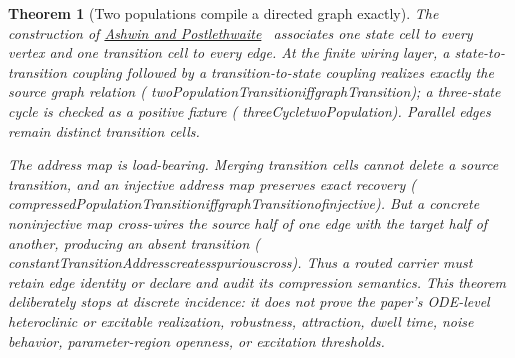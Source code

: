 \documentclass[11pt]{article}
\newtheorem{theorem}{Theorem}[section]
\newcommand{\leanname}[1]{{\scriptsize\ttfamily
  \def\_{\textunderscore\allowbreak}#1}}
\begin{document}
\begin{theorem}[Two populations compile a directed graph exactly]
The construction of
\href{https://arxiv.org/abs/1506.03212}{Ashwin and
Postlethwaite}~\cite{ashwinpostlethwaite2015} associates one state cell to
every vertex and one transition cell to every edge. At the finite wiring
layer, a state-to-transition coupling followed by a transition-to-state
coupling realizes exactly the source graph relation
(\leanname{twoPopulationTransition\_iff\_graphTransition}); a three-state
cycle is checked as a positive fixture
(\leanname{threeCycle\_twoPopulation}). Parallel edges remain
distinct transition cells.

The address map is load-bearing. Merging transition cells cannot delete a
source transition, and an injective address map preserves exact recovery
(\leanname{compressedPopulationTransition\_iff\_graphTransition\_of\_injective}).
But a concrete noninjective map cross-wires the source half of one edge with
the target half of another, producing an absent transition
(\leanname{constantTransitionAddress\_creates\_spurious\_cross}). Thus a
routed carrier must retain edge identity or declare and audit its compression
semantics. This theorem deliberately stops at discrete incidence: it does not
prove the paper's ODE-level heteroclinic or excitable realization, robustness,
attraction, dwell time, noise behavior, parameter-region openness, or
excitation thresholds.
\end{theorem}
\end{document}
